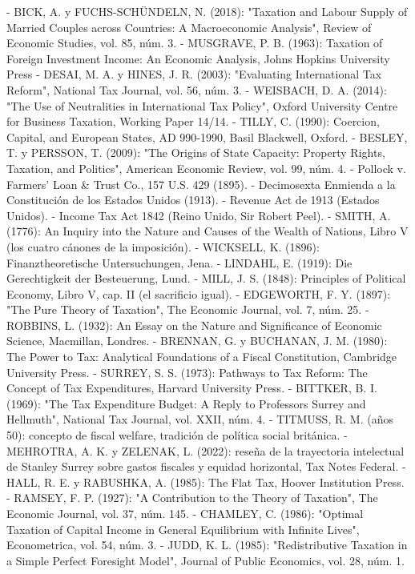 \documentclass[10pt,a4paper]{article}
\begin{document}
- BICK, A. y FUCHS-SCHÜNDELN, N. (2018): "Taxation and Labour Supply of Married Couples across Countries: A Macroeconomic Analysis", Review of Economic Studies, vol. 85, núm. 3.
- MUSGRAVE, P. B. (1963): Taxation of Foreign Investment Income: An Economic Analysis, Johns Hopkins University Press
- DESAI, M. A. y HINES, J. R. (2003): "Evaluating International Tax Reform", National Tax Journal, vol. 56, núm. 3.
- WEISBACH, D. A. (2014): "The Use of Neutralities in International Tax Policy", Oxford University Centre for Business Taxation, Working Paper 14/14.
- TILLY, C. (1990): Coercion, Capital, and European States, AD 990-1990, Basil Blackwell, Oxford.
- BESLEY, T. y PERSSON, T. (2009): "The Origins of State Capacity: Property Rights, Taxation, and Politics", American Economic Review, vol. 99, núm. 4.
- Pollock v. Farmers' Loan \& Trust Co., 157 U.S. 429 (1895).
- Decimosexta Enmienda a la Constitución de los Estados Unidos (1913).
- Revenue Act de 1913 (Estados Unidos).
- Income Tax Act 1842 (Reino Unido, Sir Robert Peel).
- SMITH, A. (1776): An Inquiry into the Nature and Causes of the Wealth of Nations, Libro V (los cuatro cánones de la imposición).
- WICKSELL, K. (1896): Finanztheoretische Untersuchungen, Jena.
- LINDAHL, E. (1919): Die Gerechtigkeit der Besteuerung, Lund.
- MILL, J. S. (1848): Principles of Political Economy, Libro V, cap. II (el sacrificio igual).
- EDGEWORTH, F. Y. (1897): "The Pure Theory of Taxation", The Economic Journal, vol. 7, núm. 25.
- ROBBINS, L. (1932): An Essay on the Nature and Significance of Economic Science, Macmillan, Londres.
- BRENNAN, G. y BUCHANAN, J. M. (1980): The Power to Tax: Analytical Foundations of a Fiscal Constitution, Cambridge University Press.
- SURREY, S. S. (1973): Pathways to Tax Reform: The Concept of Tax Expenditures, Harvard University Press.
- BITTKER, B. I. (1969): "The Tax Expenditure Budget: A Reply to Professors Surrey and Hellmuth", National Tax Journal, vol. XXII, núm. 4.
- TITMUSS, R. M. (años 50): concepto de fiscal welfare, tradición de política social británica.
- MEHROTRA, A. K. y ZELENAK, L. (2022): reseña de la trayectoria intelectual de Stanley Surrey sobre gastos fiscales y equidad horizontal, Tax Notes Federal.
- HALL, R. E. y RABUSHKA, A. (1985): The Flat Tax, Hoover Institution Press.
- RAMSEY, F. P. (1927): "A Contribution to the Theory of Taxation", The Economic Journal, vol. 37, núm. 145.
- CHAMLEY, C. (1986): "Optimal Taxation of Capital Income in General Equilibrium with Infinite Lives", Econometrica, vol. 54, núm. 3.
- JUDD, K. L. (1985): "Redistributive Taxation in a Simple Perfect Foresight Model", Journal of Public Economics, vol. 28, núm. 1.
\end{document}
